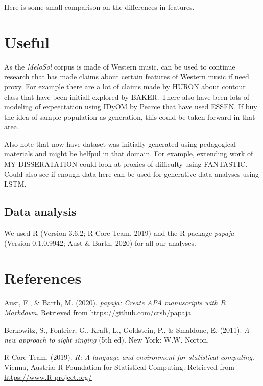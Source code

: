 \documentclass[english,man]{apa6}
\begin{document}
Here is some small comparison on the differences in features.

\hypertarget{useful}{%
\section{Useful}\label{useful}}

As the \emph{MeloSol} corpus is made of Western music, can be used to continue research that has made claims about certain features of Western music if need proxy.
For example there are a lot of claims made by HURON about contour class that have been initiall explored by BAKER.
There also have been lots of modeling of expeectation using IDyOM by Pearce that have used ESSEN.
If buy the idea of sample population as generation, this could be taken forward in that area.

Also note that now have dataset was initially generated using pedagogical materials and might be helfpul in that domain.
For example, extending work of MY DISSERATATION could look at proxies of difficulty using FANTASTIC.
Could also see if enough data here can be used for generative data analyses using LSTM.

\hypertarget{data-analysis}{%
\subsection{Data analysis}\label{data-analysis}}

We used R (Version 3.6.2; R Core Team, 2019) and the R-package \emph{papaja} (Version 0.1.0.9942; Aust \& Barth, 2020) for all our analyses.

\newpage

\hypertarget{references}{%
\section{References}\label{references}}

\begingroup
\setlength{\parindent}{-0.5in}
\setlength{\leftskip}{0.5in}

\hypertarget{refs}{}
\leavevmode\hypertarget{ref-R-papaja}{}%
Aust, F., \& Barth, M. (2020). \emph{papaja: Create APA manuscripts with R Markdown}. Retrieved from \url{https://github.com/crsh/papaja}

\leavevmode\hypertarget{ref-berkowitzNewApproachSight2011}{}%
Berkowitz, S., Fontrier, G., Kraft, L., Goldstein, P., \& Smaldone, E. (2011). \emph{A new approach to sight singing} (5th ed). New York: W.W. Norton.

\leavevmode\hypertarget{ref-R-base}{}%
R Core Team. (2019). \emph{R: A language and environment for statistical computing}. Vienna, Austria: R Foundation for Statistical Computing. Retrieved from \url{https://www.R-project.org/}

\endgroup
\end{document}
